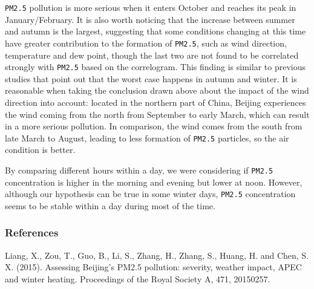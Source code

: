 \documentclass[
]{article}
\begin{document}
\texttt{PM2.5} pollution is more serious when it enters October and
reaches its peak in January/February. It is also worth noticing that the
increase between summer and autumn is the largest, suggesting that some
conditions changing at this time have greater contribution to the
formation of \texttt{PM2.5}, such as wind direction, temperature and dew
point, though the last two are not found to be correlated strongly with
\texttt{PM2.5} based on the correlogram. This finding is similar to
previous studies that point out that the worst case happens in autumn
and winter. It is reasonable when taking the conclusion drawn above
about the impact of the wind direction into account: located in the
northern part of China, Beijing experiences the wind coming from the
north from September to early March, which can result in a more serious
pollution. In comparison, the wind comes from the south from late March
to August, leading to less formation of \texttt{PM2.5} particles, so the
air condition is better.

By comparing different hours within a day, we were considering if
\texttt{PM2.5} concentration is higher in the morning and evening but
lower at noon. However, although our hypothesis can be true in some
winter days, \texttt{PM2.5} concentration seems to be stable within a
day during most of the time.

\hypertarget{references}{%
\subsubsection{References}\label{references}}

Liang, X., Zou, T., Guo, B., Li, S., Zhang, H., Zhang, S., Huang, H. and
Chen, S. X. (2015). Assessing Beijing's PM2.5 pollution: severity,
weather impact, APEC and winter heating. Proceedings of the Royal
Society A, 471, 20150257.
\end{document}
